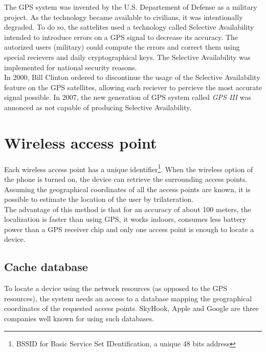 The GPS system was invented by the U.S. Departement of Defense as a military project.
As the technology became available to civilians, it was intentionally degraded.
To do so, the sattelites used a technology called Selective Availability intended to introduce errors on a GPS signal to decrease its accuracy.
The autorized users (military) could compute the errors and correct them using special recievers and daily cryptographical keys.
The Selective Availability was implemented for national security reasons.\\

In 2000, Bill Clinton ordered to discontinue the usage of the Selective Availability feature on the GPS satellites, allowing each reciever to percieve the most accurate signal possible. In 2007, the new generation of GPS system called \emph{GPS III} was annonced as not capable of producing Selective Availability\cite{gps-sa}.\\

\section{Wireless access point}
\label{sec:andro-wifi}
Each wireless access point has a unique identifier\footnote{BSSID for Basic Service Set IDentification, a unique 48 bits address}.
When the wireless option of the phone is turned on, the device can retrieve the surrounding access points.
Assuming the geographical coordinates of all the access points are known, it is possible to estimate the location of the user by trilateration.\\

The advantage of this method is that for an accuracy of about 100 meters, the localization is faster than using GPS, it works indoors, consumes less battery power than a GPS receiver chip and only one access point is enough to locate a device.\\

\subsection{Cache database}
\label{sec:andro-cell-db}

To locate a device using the network resources (as opposed to the GPS resources), the system needs an access to a database mapping the geographical coordinates of the requested access points.
SkyHook, Apple and Google are three companies well known for using such databases.\\

